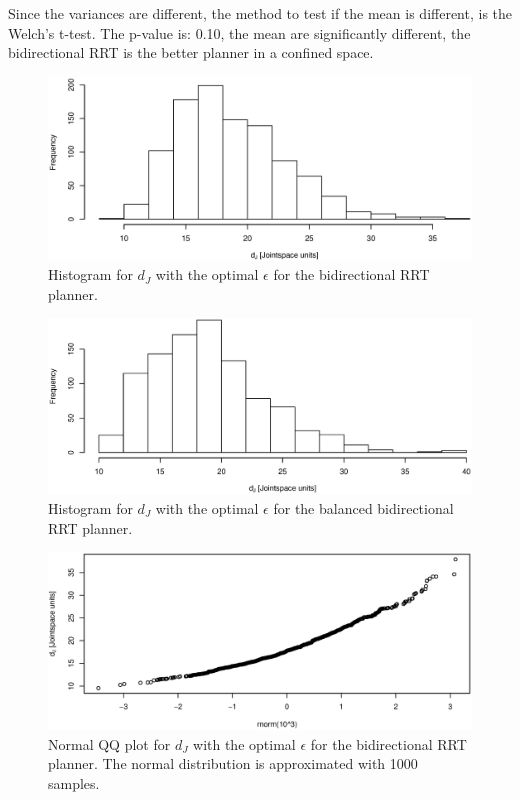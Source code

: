 Since the variances are different, the method to test if the mean is different, is the Welch's t-test.
The p-value is:  0.10, the mean are significantly different, the bidirectional RRT is the better planner in a confined space.

\begin{figure}[h]
 \centering
 \includegraphics[width=\figsize]{graphics/hist_op_bi}
 \caption{Histogram for \(d_J\) with the optimal \(\epsilon\) for the bidirectional RRT planner.}
 \label{fig:bidir_histogram}
\end{figure}

\begin{figure}[h]
 \centering
 \includegraphics[width=\figsize]{graphics/hist_op_ba}
 \caption{Histogram for \(d_J\) with the optimal \(\epsilon\) for the balanced bidirectional RRT planner.}
 \label{fig:balanced_histogram}
\end{figure}

\begin{figure}[h]
 \centering
 \includegraphics[width=\figsize]{graphics/qq_op_bi}
 \caption{Normal QQ plot for \(d_J\) with the optimal \(\epsilon\) for the bidirectional RRT planner. The normal distribution is approximated with 1000 samples.}
 \label{fig:bidir_qq}
\end{figure}

